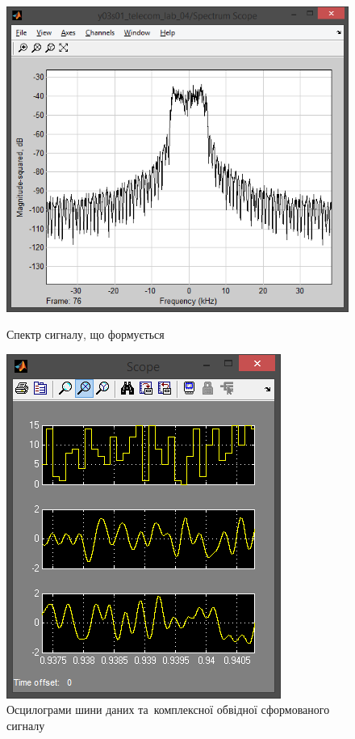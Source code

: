 \documentclass[
	a4paper,
	oneside,
	BCOR = 10mm,
	DIV = 12,
	12pt,
	headings = normal,
]{scrartcl}
\begin{document}
				\begin{figure}[!htbp]
					\begin{minipage}[t]{0.5\textwidth - 0.5em}
						\centering
						\includegraphics[height = 8\baselineskip]{../01-solution/rolloff-0p0-spectrum-scope.png}
						\caption{Спектр сигналу, що формується}
						\label{fig:rolloff-0p0-spectrum-scope}
					\end{minipage}\hspace{1em}%
					\begin{minipage}[t]{0.5\textwidth - 0.5em}
						\centering
						\includegraphics[height = 8\baselineskip]{../01-solution/rolloff-0p0-scope.png}
						\caption{Осцилограми шини даних та~комплексної обвідної сформованого сигналу}
						\label{fig:rolloff-0p0-scope}
					\end{minipage}%
				\end{figure}
\end{document}

